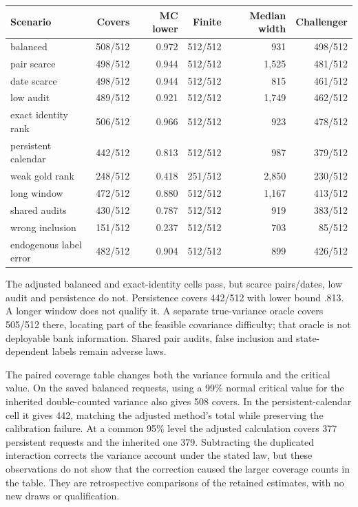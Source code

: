 \begin{center}\footnotesize\begin{tabular}{lrrrrr}\toprule
Scenario & Covers & MC lower & Finite & Median width & Challenger\\
\midrule
balanced & 508/512 & 0.972 & 512/512 & 931 & 498/512 \\
pair scarce & 498/512 & 0.944 & 512/512 & 1,525 & 481/512 \\
date scarce & 498/512 & 0.944 & 512/512 & 815 & 461/512 \\
low audit & 489/512 & 0.921 & 512/512 & 1,749 & 462/512 \\
exact identity rank & 506/512 & 0.966 & 512/512 & 923 & 478/512 \\
persistent calendar & 442/512 & 0.813 & 512/512 & 987 & 379/512 \\
weak gold rank & 248/512 & 0.418 & 251/512 & 2,850 & 230/512 \\
long window & 472/512 & 0.880 & 512/512 & 1,167 & 413/512 \\
shared audits & 430/512 & 0.787 & 512/512 & 919 & 383/512 \\
wrong inclusion & 151/512 & 0.237 & 512/512 & 703 & 85/512 \\
endogenous label error & 482/512 & 0.904 & 512/512 & 899 & 426/512 \\
\bottomrule\end{tabular}\end{center}


The adjusted balanced and exact-identity cells pass, but scarce pairs/dates, low audit and persistence do not. Persistence covers 442/512 with lower bound .813. A longer window does not qualify it. A separate true-variance oracle covers 505/512 there, locating part of the feasible covariance difficulty; that oracle is not deployable bank information. Shared pair audits, false inclusion and state-dependent labels remain adverse laws.

The paired coverage table changes both the variance formula and the
critical value. On the saved balanced requests, using a 99\% normal critical
value for the inherited double-counted variance also gives 508 covers. In
the persistent-calendar cell it gives 442, matching the adjusted method's
total while preserving the calibration failure. At a common 95\% level the
adjusted calculation covers 377 persistent requests and the inherited one
379. Subtracting the duplicated interaction corrects the variance account
under the stated law, but these observations do not show that the correction
caused the larger coverage counts in the table. They are retrospective
comparisons of the retained estimates, with no new draws or qualification.

